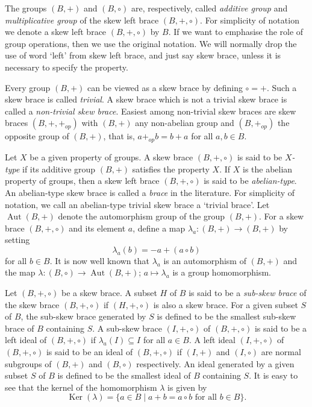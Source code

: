 \documentclass[10pt,a4paper]{amsart}
\numberwithin{equation}{section}
\newcommand{\Aut}{\operatorname{Aut} }
\newcommand{\Ker}{\operatorname{Ker} }
\begin{document}
The groups $(B,+)$ and $(B,\circ)$ are, respectively, called  {\it additive group} and {\it multiplicative group} of the skew left brace $(B, +, \circ)$.  For simplicity of notation we denote a skew left brace $(B, +, \circ)$ by $B$. If we want to emphasise the role of  group operations, then we use the original notation.   We will normally drop the use of word `left' from skew left brace, and just say  skew brace, unless it is necessary to specify the property.

Every group $(B, +)$ can be viewed as a skew  brace by defining $\circ = +$. Such a skew brace is called \emph{trivial}. A skew brace which is not a trivial skew brace is called a \emph{non-trivial skew brace}.
 Easiest among non-trivial skew braces are skew braces $(B, +, +_{op})$ with $(B, +)$ any non-abelian group and $(B, +_{op})$  the opposite group of $(B, +)$, that is, $a +_{op} b = b + a$ for all $a, b \in B$.

   Let $X$ be a given property of  groups.   A skew brace $(B, +, \circ)$ is said to be {\it $X$-type} if its additive group $(B,+)$ satisfies  the property $X$. If $X$ is the abelian property of groups, then a  skew left brace $(B, +, \circ)$ is said to be  \emph{abelian-type}.  An abelian-type skew  brace is called a \emph{brace} in the literature. For simplicity of notation, we call an abelian-type trivial skew brace a `trivial brace'.
Let $\Aut(B, +)$ denote the automorphism group of the group $(B, +)$. For a skew brace  $(B, +, \circ)$ and its element  $a$, define a map $\lambda_a : (B, +) \to (B, +)$  by setting 
 $$\lambda_a(b) = - a + (a \circ b)$$ 
 for all $b \in B$. It is now well known that $\lambda_a$ is an automorphism of $(B, +)$ and the  map $\lambda : (B, \circ) \to \Aut(B, +)$; $a \mapsto \lambda_a$ is a group homomorphism. 
    

  Let $(B,  +, \circ)$ be a skew  brace. A subset $H$ of $B$ is said to be a {\it sub-skew  brace} of the skew   brace $(B, +, \circ)$  if $(H, + , \circ)$ is also a skew  brace.   For a given subset $S$ of $B$, the sub-skew brace generated by $S$ is defined to be the smallest sub-skew brace of $B$ containing $S$.  A sub-skew brace $(I, +, \circ)$ of  $(B, +, \circ)$  is said to be a left ideal of $(B, +, \circ)$ if $\lambda_a(I) \subseteq I$ for all  $a \in B$.  A left ideal $(I, +, \circ)$ of $(B, +, \circ)$ is said to be an ideal of $(B, +, \circ)$ if $(I, +)$ and $(I, \circ)$ are normal subgroups of $(B, +)$ and $(B, \circ)$ respectively.   An ideal generated by a given subset $S$ of $B$ is defined to be the smallest ideal of $B$ containing $S$. It is easy to see that the  kernel of the homomorphism $\lambda$ is given by 
 $$\Ker(\lambda) = \{a \in B \mid a + b = a \circ b \mbox{ for all } b \in B \}.$$
\end{document}
